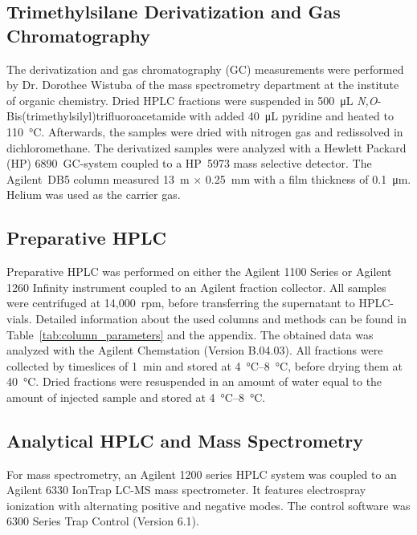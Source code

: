 	\subsection{Trimethylsilane Derivatization and Gas Chromatography} %
	\label{sub:trimethylsilane_derivatization_and_gas_chromatography}

	The derivatization and gas chromatography (GC) measurements were performed by Dr. Dorothee Wistuba of the mass spectrometry department at the institute of organic chemistry.
	Dried HPLC fractions were suspended in \SI{500}{\micro\liter} \emph{N,O}-Bis(trimethylsilyl)\-trifluoro\-acetamide with added \SI{40}{\micro\liter} pyridine and heated to \SI{110}{\celsius}. Afterwards, the samples were dried with nitrogen gas and redissolved in dichloromethane.
	The derivatized samples were analyzed with a Hewlett Packard (HP) 6890~GC-system coupled to a HP~5973 mass selective detector. The Agilent~DB5 column measured 13~m $\times$ 0.25~mm with a film thickness of \SI{0.1}{\micro\meter}. Helium was used as the carrier gas.

	\subsection{Preparative HPLC} %
	\label{sub:preparative_hplc}

	Preparative HPLC was performed on either the Agilent 1100 Series or Agilent 1260 Infinity instrument coupled to an Agilent  fraction collector. All samples were centrifuged at 14,000~rpm, before transferring the supernatant to HPLC-vials. Detailed information about the used columns and methods can be found in Table~\ref{tab:column_parameters} and the appendix. The obtained data was analyzed with the Agilent Chemstation (Version B.04.03).
	All fractions were collected by timeslices of \SI{1}{\minute} and stored at \SIrange{4}{8}{\celsius}, before drying them at \SI{40}{\celsius}. Dried fractions were resuspended in an amount of water equal to the amount of injected sample and stored at \SIrange{4}{8}{\celsius}.


	\subsection{Analytical HPLC and Mass Spectrometry} %
	\label{sub:analytical_hplc_and_mass_spectrometry}


	For mass spectrometry, an Agilent 1200 series HPLC system was coupled to an Agilent 6330 IonTrap LC-MS mass spectrometer. It features electrospray ionization with alternating positive and negative modes. The control software was 6300 Series Trap Control (Version 6.1).

